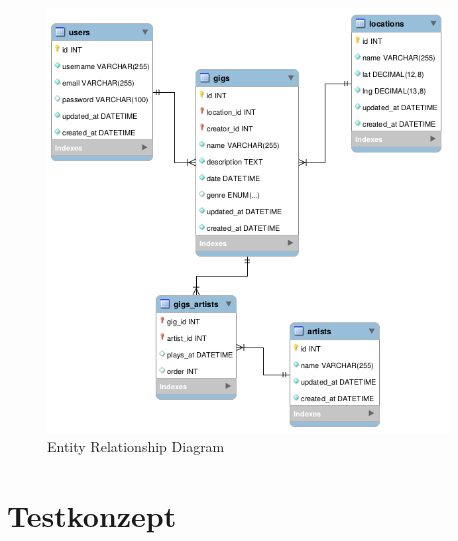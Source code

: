 \begin{figure}[!htb]
  \centering
  \includegraphics[width=0.95\textwidth]{konzept/erd.png}
  \caption{Entity Relationship Diagram}
\end{figure}

\clearpage
\section{Testkonzept}\label{testkonzept}

